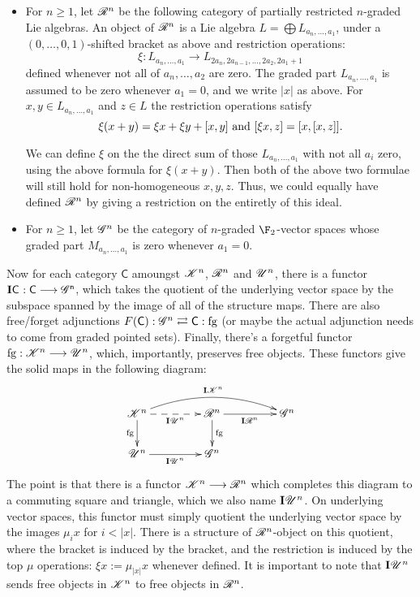\documentclass[11pt]{article}
\newcommand{\LL}[1]{{\scrK}^{#1}}%
\newcommand{\PR}[1]{\scrR^{#1}}%
\newcommand{\GR}[1]{\scrG^{#1}}%
\newcommand{\nontop}[1]{\scrU^{#1}}%
\newcommand{\restn}[1]{\xi{#1}}
\newcommand{\Ind}[2][]{\mathbf{I}{#2}_{#1}}%
\newcommand{\forget}{\mathrm{fg}}
\begin{document}
\begin{itemize}
\item 
For $n\geq1$, let $\PR{n}$ be the following category of partially restricted $n$-graded Lie algebras. An object of $\PR{n}$ is a Lie algebra $L=\bigoplus L_{a_n,\ldots,a_1}$, under a $(0,\ldots,0,1)$-shifted bracket as above
and restriction operations:
\[\restn{}:L_{a_n,\ldots,a_1}\to L_{2a_n,2a_{n-1},\ldots,2a_2,2a_1+1}\]
defined whenever not all of $a_n,\ldots,a_{2}$ are zero. The graded part $L_{a_n,\ldots,a_1}$ is assumed to be zero whenever $a_1=0$, and we write $|x|$ as above. For $x,y\in L_{a_n,\ldots,a_1}$ and $z\in L$ the restriction operations satisfy \[\restn{(x+y)}=\restn{x}+\restn{y}+[x,y]\textup{ and }[\restn{x},z]=[x,[x,z]].\]
\begin{shaded}\noindent
We can define $\restn{}$ on the the direct sum of those $L_{a_n,\ldots,a_1}$ with not all $a_i$ zero, using the above formula for $\restn{(x+y)}$. Then both of the above two formulae will still hold for non-homogeneous $x,y,z$. Thus, we could equally have defined $\PR{n}$ by giving a restriction on the entiretly of this ideal.
\end{shaded}

\item For $n\geq1$, let $\GR{n}$ be the category of $n$-graded $\F_2$-vector spaces whose graded part $M_{a_n,\ldots,a_1}$ is zero whenever $a_1=0$.
\end{itemize}

Now for each category $\mathsf{C}$ amoungst $\LL{n}$, $\PR{n}$ and $\nontop{n}$, there is a functor $\Ind{\mathsf{C}}:\mathsf{C\overset{}{\to}\GR{n}}$, which takes the quotient of the underlying vector space by the subspace spanned by the image of all of the structure maps. There are also free/forget adjunctions $F(\mathsf{C}):\GR{n} \rightleftarrows \mathsf{C}:\forget$ (or maybe the actual adjunction needs to come from graded pointed sets). Finally, there's a forgetful functor $\forget:\LL{n}\to\nontop{n}$, which, importantly, preserves  free objects. These functors give the solid maps in the following diagram:
\[\xymatrix@R=8mm@C=15mm@!C{
\LL{n}
\ar@/^1.5em/[rr]^-{\Ind{\LL{n}}}
\ar[d]_-{\forget}
\ar@{-->}[r]_-{\Ind{\nontop{n}}}
&%
\PR{n}
\ar[d]^-{\forget}
\ar[r]_-{\Ind{\PR{n}}}
&%
\GR{n}
\\%
\nontop{n}
\ar[r]_-{\Ind{\nontop{n}}}
&%
\GR{n}
&%
}\]
The point is that there is a functor $\LL{n}\to\PR{n}$ which completes this diagram to a commuting square and triangle, which we also name $\Ind{\nontop{n}}$. On underlying vector spaces, this functor must simply quotient the underlying vector space by the images $\mu_ix$ for $i<|x|$. There is a structure of $\PR{n}$-object on this quotient, where the bracket is induced by the bracket, and the restriction is induced by the top $\mu$ operations: $\restn{x}:=\mu_{|x|}x$ whenever defined. It is important to note that $\Ind{\nontop{n}}$ sends free objects in $\LL{n}$ to free objects in $\PR{n}$.
\end{document}
